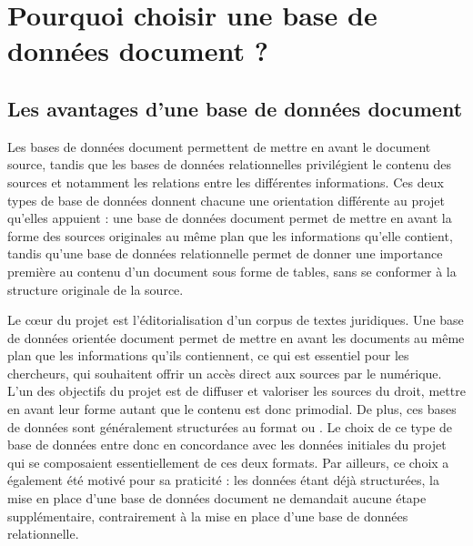 \section{Pourquoi choisir une base de données document ? }
    \subsection{Les avantages d’une base de données document}
Les bases de données document permettent de mettre en avant le document source, tandis que les bases de données relationnelles privilégient le contenu des sources et notamment les relations entre les différentes informations. Ces deux types de base de données donnent chacune une orientation différente au projet qu'elles appuient : une base de données document permet de mettre en avant la forme des sources originales au même plan que les informations qu'elle contient, tandis qu'une base de données relationnelle permet de donner une importance première au contenu d'un document sous forme de tables, sans se conformer à la structure originale de la source. 
    
Le c\oe ur du projet \COREL est l'éditorialisation d'un corpus de textes juridiques. Une base de données orientée document permet de mettre en avant les documents au même plan que les informations qu'ils contiennent, ce qui est essentiel pour les chercheurs, qui souhaitent offrir un accès direct aux sources par le numérique. L'un des objectifs du projet \COREL est de diffuser et valoriser les sources du droit, mettre en avant leur forme autant que le contenu est donc primodial. De plus, ces bases de données sont généralement structurées au format \XML ou \JSON. Le choix de ce type de base de données entre donc en concordance avec les données initiales du projet qui se composaient essentiellement de ces deux formats. Par ailleurs, ce choix a également été motivé pour sa praticité : les données étant déjà structurées, la mise en place d'une base de données document ne demandait aucune étape supplémentaire, contrairement à la mise en place d'une base de données relationnelle. 

